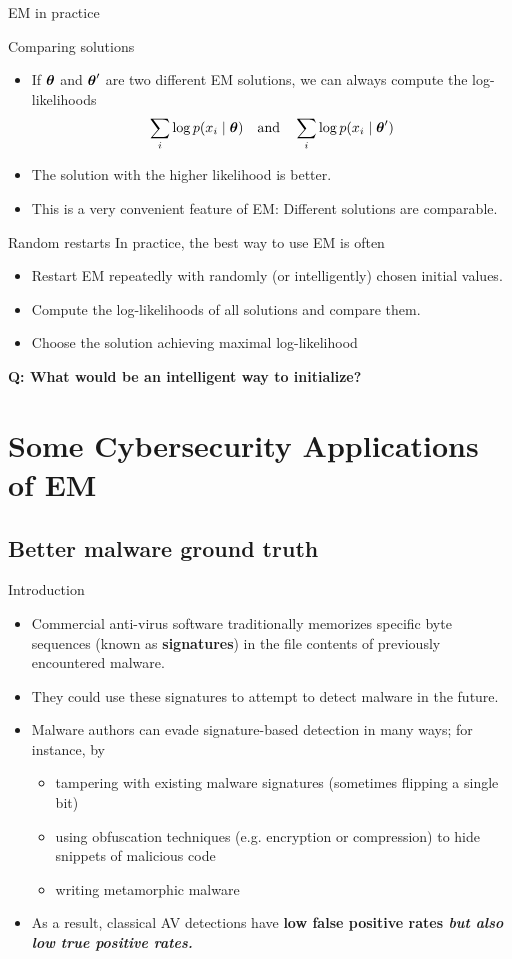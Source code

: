 \documentclass[10pt]{beamer}
\begin{document}
\begin{frame}{EM in practice}
\footnotesize
\begin{sblock}{Comparing solutions}
\begin{itemize}
\item If ${\boldsymbol \theta}$ and ${\boldsymbol \theta}^\prime$ are two different EM solutions, we can always compute the log-likelihoods
\[ \displaystyle\sum_i \log p(x_i \; | \; {\boldsymbol \theta}) \quad \text{and} \quad \displaystyle\sum_i \log p(x_i \; | \; {\boldsymbol \theta}^\prime) \]
\item The solution with the higher likelihood is better.
\item This is a very convenient feature of EM: Different solutions are comparable. 
\end{itemize}
\end{sblock}
\begin{sblock}{Random restarts}
In practice, the best way to use EM is often
\begin{itemize}
\item Restart EM repeatedly with randomly (or intelligently) chosen initial values.
\item Compute the log-likelihoods of all solutions and compare them.
\item Choose the solution achieving maximal log-likelihood
\end{itemize}
\end{sblock}
\vfill
\tiny \bf{Q}: What would be an intelligent way to initialize?
\end{frame}


\section{Some Cybersecurity Applications of EM}
\subsection{Better malware ground truth}
\begin{frame}{Introduction}
\begin{itemize}
\item Commercial anti-virus software traditionally memorizes specific byte sequences (known as \textbf{signatures}) in the file contents of previously encountered malware. 
\item They could use these signatures to attempt to detect malware in the future.
\item Malware authors can evade signature-based detection in many ways; for instance, by
	\begin{itemize}
	\item tampering with existing malware signatures (sometimes flipping a single bit)
	\item  using obfuscation techniques (e.g. encryption or compression) to hide snippets of malicious code
	\item writing metamorphic malware
	\end{itemize}
\item As a result, classical AV detections have \bf{low false positive} rates \it{but also} \bf{low true positive} rates.
\end{itemize}
\end{frame}
\end{document}
